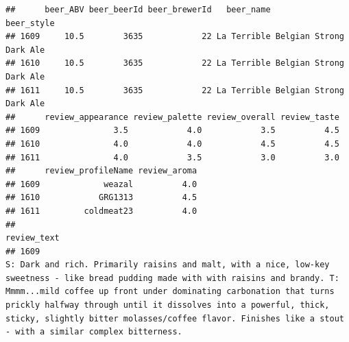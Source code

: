 \documentclass[
  a4paper,
]{article}
\begin{document}
\begin{verbatim}
##      beer_ABV beer_beerId beer_brewerId   beer_name              beer_style
## 1609     10.5        3635            22 La Terrible Belgian Strong Dark Ale
## 1610     10.5        3635            22 La Terrible Belgian Strong Dark Ale
## 1611     10.5        3635            22 La Terrible Belgian Strong Dark Ale
##      review_appearance review_palette review_overall review_taste
## 1609               3.5            4.0            3.5          4.5
## 1610               4.0            4.0            4.5          4.5
## 1611               4.0            3.5            3.0          3.0
##      review_profileName review_aroma
## 1609             weazal          4.0
## 1610            GRG1313          4.5
## 1611         coldmeat23          4.0
##                                                                                                                                                                                                                                                                                                                                                                                                                                                                                                                                                                                                                                                                                                                                                                                                                                                                                                                                                                                          review_text
## 1609                                                                                                                                                                                                                                                                                                                                                                                                                                                                                                                                                                                                       S: Dark and rich. Primarily raisins and malt, with a nice, low-key sweetness - like bread pudding made with with raisins and brandy. T: Mmmm...mild coffee up front under dominating carbonation that turns prickly halfway through until it dissolves into a powerful, thick, sticky, slightly bitter molasses/coffee flavor. Finishes like a stout - with a similar complex bitterness.

\end{verbatim}
\end{document}
